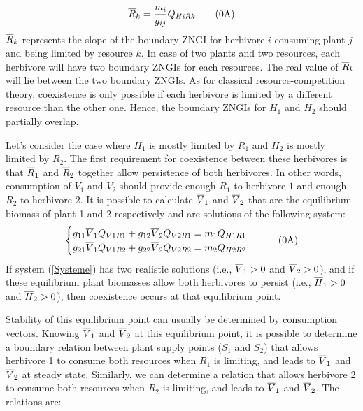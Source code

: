 \documentclass[12pt]{article}
\newcommand\barre[1]{\overline{\rule{0pt}{1.5ex}#1}}
\begin{document}
\begin{equation}
\barre{R}_k=\frac{m_i}{g_{ij}}Q_{HiRk} \tag{\theequation A}
\end{equation}
$\barre{R}_k$ represents the slope of the boundary ZNGI for herbivore $i$ consuming plant $j$ and being limited by resource $k$. In case of two plants and two resources, each herbivore will have two boundary ZNGIs for each resources. The real value of $\barre{R}_k$ will lie between the two boundary ZNGIs. As for classical resource-competition theory, coexistence is only possible if each herbivore is limited by a different resource than the other one. Hence, the boundary ZNGIs for $H_1$ and $H_2$ should partially overlap.   
\par
Let's consider the case where $H_1$ is mostly limited by $R_1$ and $H_2$ is mostly limited by $R_2$. The first requirement for coexistence between these herbivores is that $\barre{R}_1$ and $\barre{R}_2$ together allow persistence of both herbivores. In other words, consumption of $V_1$ and $V_2$ should provide enough $R_1$ to herbivore $1$ and enough $R_2$ to herbivore 2. It is possible to calculate $\barre{V}_1$ and $\barre{V}_2$ that are the equilibrium biomass of plant 1 and 2 respectively and are solutions of the following system:
\begin{equation} \label{Systeme}
\begin{cases}
g_{11}\barre{V}_1 Q_{V1R1}+g_{12}\barre{V}_2 Q_{V2R1}=m_1 Q_{H1R1} \\
g_{21}\barre{V}_1 Q_{V1R2}+g_{22}\barre{V}_2 Q_{V2R2}=m_2 Q_{H2R2}
\end{cases} \tag{\theequation A}
\end{equation}
If system (\ref{Systeme}) has two realistic solutions (i.e., $\barre{V}_1 > 0$ and $\barre{V}_2 > 0$), and if these equilibrium plant biomasses allow both herbivores to persist (i.e., $\barre{H}_1>0$ and $\barre{H}_2 >0$), %
then coexistence occurs at that equilibrium point. %
\par
Stability of this equilibrium point can usually be determined by consumption vectors. Knowing $\barre{V}_1$ and $\barre{V}_2$ at this equilibrium point, it is possible to determine a boundary relation between plant supply points ($S_1$ and $S_2$) that allows herbivore 1 to consume both resources when $R_1$ is limiting, and leads to $\barre{V}_1$ and $\barre{V}_2$ at steady state. Similarly, we can determine a relation that allows herbivore 2 to consume both resources when $R_2$ is limiting, and leads to $\barre{V}_1$ and $\barre{V}_2$. The relations are:
\end{document}
